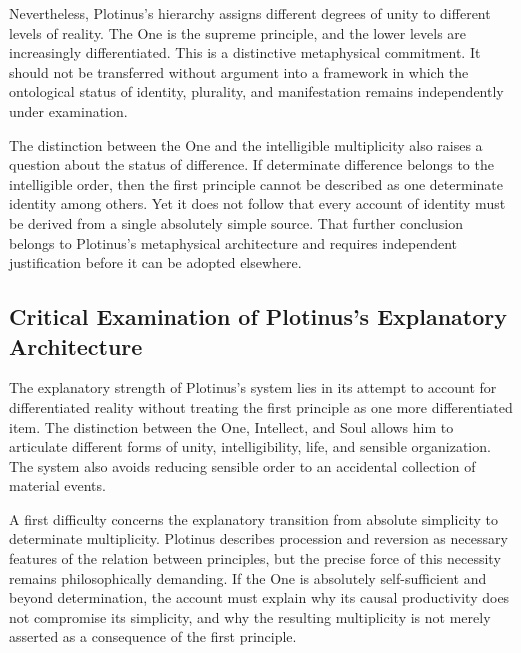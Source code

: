 \label{para:VS.B01.P01.C08.S06.SS07.P003}
Nevertheless, Plotinus's hierarchy assigns different degrees of
unity to different levels of reality. The One is the supreme
principle, and the lower levels are increasingly differentiated.
This is a distinctive metaphysical commitment. It should not be
transferred without argument into a framework in which the
ontological status of identity, plurality, and manifestation
remains independently under examination.

\label{para:VS.B01.P01.C08.S06.SS07.P004}
The distinction between the One and the intelligible multiplicity
also raises a question about the status of difference. If determinate
difference belongs to the intelligible order, then the first
principle cannot be described as one determinate identity among
others. Yet it does not follow that every account of identity must
be derived from a single absolutely simple source. That further
conclusion belongs to Plotinus's metaphysical architecture and
requires independent justification before it can be adopted elsewhere.

\subsection{Critical Examination of Plotinus's Explanatory Architecture}
\label{subsec:ch08-plotinus-critical-examination}

\label{para:VS.B01.P01.C08.S06.SS08.P001}
The explanatory strength of Plotinus's system lies in its attempt
to account for differentiated reality without treating the first
principle as one more differentiated item. The distinction between
the One, Intellect, and Soul allows him to articulate different
forms of unity, intelligibility, life, and sensible organization.
The system also avoids reducing sensible order to an accidental
collection of material events.

\label{para:VS.B01.P01.C08.S06.SS08.P002}
A first difficulty concerns the explanatory transition from absolute
simplicity to determinate multiplicity. Plotinus describes procession
and reversion as necessary features of the relation between principles,
but the precise force of this necessity remains philosophically
demanding. If the One is absolutely self-sufficient and beyond
determination, the account must explain why its causal productivity
does not compromise its simplicity, and why the resulting multiplicity
is not merely asserted as a consequence of the first principle.

